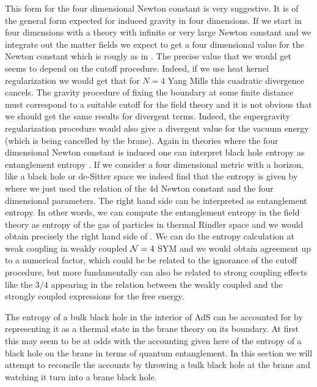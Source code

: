  This form for the four dimensional Newton constant is very
suggestive. It is of the general form expected for induced gravity in
four dimensions. If we start in four dimensions with a theory with 
infinite or very large Newton constant and we integrate out the matter
fields we expect to get a four dimensional value for the Newton
constant which is rougly as in \fdnew  
{}. 
The precise value that we would get seems to depend on the cutoff
procedure.
Indeed, if we use heat kernel regularization we would get that for
$N=4$ Yang Mills this cuadratic divergence cancels. 
The  gravity procedure of fixing the boundary at some finite 
distance must correspond to a suitable cutoff for the field theory and
it is not obvious that we should get the same results for divergent terms. 
Indeed, the supergravity regularization procedure would also
give a divergent value for the vacuum energy (which is being cancelled by
the brane). 
Again in theories where the four dimensional Newton constant is induced 
one can interpret black hole entropy as entanglement entropy \tj. 
If we consider a four dimensional metric with a horizon, like a black hole
or de-Sitter space we indeed find that the entropy is given by 
\eqn{}
where we just used the relation of the 4d Newton constant and the
four dimensional parameters. The right hand side can be interpreted
as entanglement entropy. In other words, we can compute the 
entanglement entropy in the field theory as entropy of the 
gas of particles in thermal Rindler space and we would obtain
precisely the right hand side of \entr . We can do the entropy 
 calculation
at weak coupling in weakly coupled ${\cal N} =4$ SYM  and we would obtain 
agreement up to a numerical factor, which could be be related to
the ignorance of the cutoff procedure, but more fundamentally can 
also be related to strong coupling effects like the $3/4$ appearing in the 
relation between the weakly coupled and the strongly coupled expressions
for the free energy.


The entropy of a bulk black hole in the interior of AdS can be  
accounted for by representing it as a thermal state in the brane 
theory on its boundary. At first this may seem to be at odds with the 
accounting given here of the entropy of a black hole on the 
brane in terms of quantum entanglement. In this section we will 
attempt to reconcile the accounts by throwing a bulk black hole at the
brane and watching it turn into a brane black hole.  


